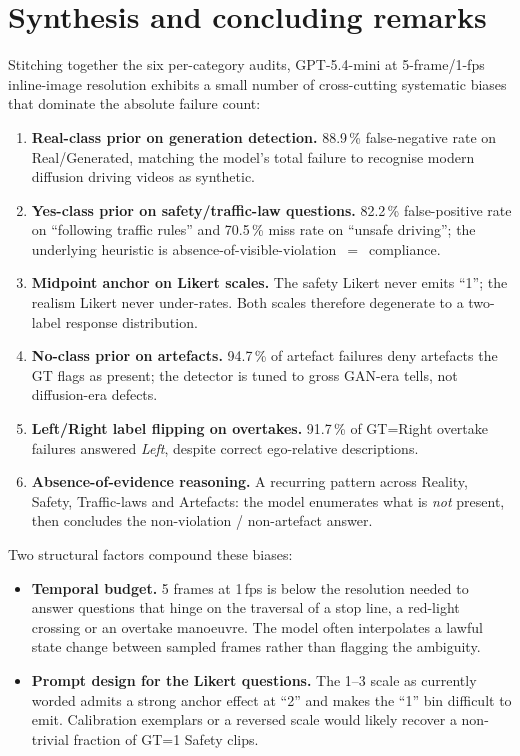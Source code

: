 \documentclass[11pt,a4paper]{article}
\newcommand{\pct}[1]{#1\,\%}
\begin{document}
\section{Synthesis and concluding remarks}

Stitching together the six per-category audits, GPT-5.4-mini at
5-frame/1-fps inline-image resolution exhibits a small number of
cross-cutting systematic biases that dominate the absolute failure
count:
\begin{enumerate}
  \item \textbf{Real-class prior on generation detection.} \pct{88.9}
  false-negative rate on Real/Generated, matching the model's total
  failure to recognise modern diffusion driving videos as synthetic.
  \item \textbf{Yes-class prior on safety/traffic-law questions.}
  \pct{82.2} false-positive rate on ``following traffic rules'' and
  \pct{70.5} miss rate on ``unsafe driving''; the underlying heuristic
  is absence-of-visible-violation~$=$~compliance.
  \item \textbf{Midpoint anchor on Likert scales.} The safety Likert
  never emits ``1''; the realism Likert never under-rates. Both
  scales therefore degenerate to a two-label response distribution.
  \item \textbf{No-class prior on artefacts.} \pct{94.7} of artefact
  failures deny artefacts the GT flags as present; the detector is
  tuned to gross GAN-era tells, not diffusion-era defects.
  \item \textbf{Left/Right label flipping on overtakes.}
  \pct{91.7} of GT=Right overtake failures answered \emph{Left},
  despite correct ego-relative descriptions.
  \item \textbf{Absence-of-evidence reasoning.} A recurring pattern
  across Reality, Safety, Traffic-laws and Artefacts: the model
  enumerates what is \emph{not} present, then concludes the
  non-violation / non-artefact answer.
\end{enumerate}

\noindent Two structural factors compound these biases:
\begin{itemize}
  \item \textbf{Temporal budget.} 5 frames at 1\,fps is below the
  resolution needed to answer questions that hinge on the traversal
  of a stop line, a red-light crossing or an overtake manoeuvre. The
  model often interpolates a lawful state change between sampled
  frames rather than flagging the ambiguity.
  \item \textbf{Prompt design for the Likert questions.} The 1--3
  scale as currently worded admits a strong anchor effect at ``2''
  and makes the ``1'' bin difficult to emit. Calibration exemplars or
  a reversed scale would likely recover a non-trivial fraction of
  GT=1 Safety clips.
\end{itemize}
\end{document}
